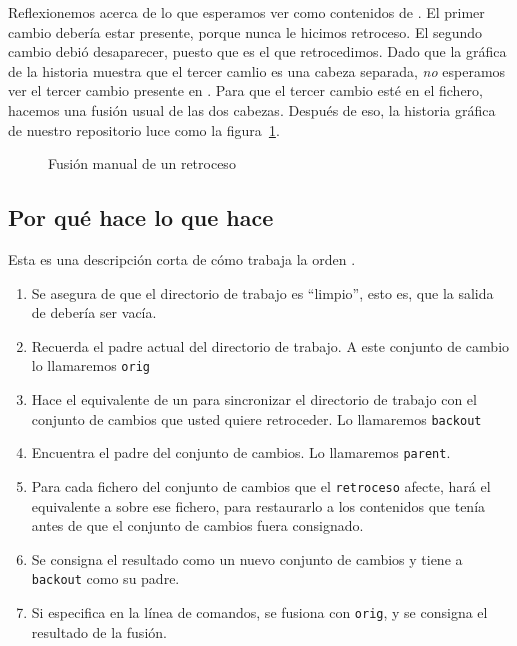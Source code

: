 Reflexionemos acerca de lo que esperamos ver como contenidos de
.  El primer cambio debería estar presente, porque
nunca le hicimos retroceso.  El segundo cambio debió desaparecer,
puesto que es el que retrocedimos.  Dado que la gráfica de la historia
muestra que el tercer camlio es una cabeza separada, \emph{no}
esperamos ver el tercer cambio presente en .
Para que el tercer cambio esté en el fichero, hacemos una fusión usual
de las dos cabezas.
Después de eso, la historia gráfica de nuestro repositorio luce como
la figura~\ref{fig:undo:backout-manual-merge}.

\begin{figure}[htb]
  \centering
  \caption{Fusión manual de un retroceso}
  \label{fig:undo:backout-manual-merge}
\end{figure}

\subsection{Por qué  hace lo que hace}

Esta es una descripción corta de cómo trabaja la orden .
\begin{enumerate}
\item Se asegura de que el directorio de trabajo es ``limpio'', esto
  es, que la salida de  debería ser vacía.
\item Recuerda el padre actual del directorio de trabajo. A este
  conjunto de cambio lo llamaremos \texttt{orig}
\item Hace el equivalente de un  para sincronizar el
  directorio de trabajo con el conjunto de cambios que usted quiere
  retroceder. Lo llamaremos \texttt{backout}
\item Encuentra el padre del conjunto de cambios. Lo llamaremos
  \texttt{parent}.
\item Para cada fichero del conjunto de cambios que el
  \texttt{retroceso} afecte, hará el equivalente a
   sobre ese fichero, para restaurarlo a
  los contenidos que tenía antes de que el conjunto de cambios fuera
  consignado.
\item Se consigna el resultado como un nuevo conjunto de cambios y
  tiene a  \texttt{backout} como su padre.
\item Si especifica  en la línea de comandos,
  se fusiona con \texttt{orig}, y se consigna el resultado de la
  fusión.
\end{enumerate}

